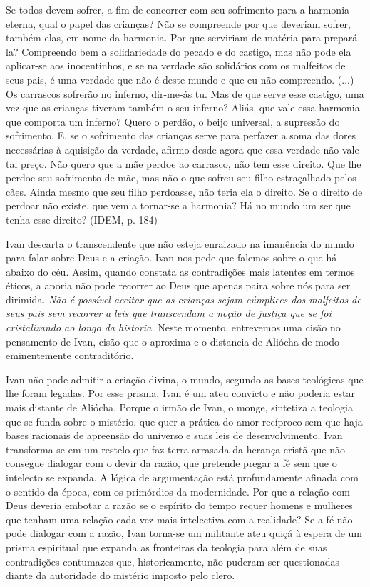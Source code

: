 Se todos devem sofrer, a fim de concorrer com seu sofrimento para a
harmonia eterna, qual o papel das crianças? Não se compreende por que
deveriam sofrer, também elas, em nome da harmonia. Por que serviriam de
matéria para prepará-la? Compreendo bem a solidariedade do pecado e do
castigo, mas não pode ela aplicar-se aos inocentinhos, e se na verdade
são solidários com os malfeitos de seus pais, é uma verdade que não é
deste mundo e que eu não compreendo. (...) Os carrascos sofrerão no
inferno, dir-me-ás tu. Mas de que serve esse castigo, uma vez que as
crianças tiveram também o seu inferno? Aliás, que vale essa harmonia que
comporta um inferno? Quero o perdão, o beijo universal, a supressão do
sofrimento. E, se o sofrimento das crianças serve para perfazer a soma
das dores necessárias à aquisição da verdade, afirmo desde agora que
essa verdade não vale tal preço. Não quero que a mãe perdoe ao carrasco,
não tem esse direito. Que lhe perdoe seu sofrimento de mãe, mas não o
que sofreu seu filho estraçalhado pelos cães. Ainda mesmo que seu filho
perdoasse, não teria ela o direito. Se o direito de perdoar não existe,
que vem a tornar-se a harmonia? Há no mundo um ser que tenha esse
direito? (IDEM, p. 184)

Ivan descarta o transcendente que não esteja enraizado na imanência do
mundo para falar sobre Deus e a criação. Ivan nos pede que falemos sobre
o que há abaixo do céu. Assim, quando constata as contradições mais
latentes em termos éticos, a aporia não pode recorrer ao Deus que apenas
paira sobre nós para ser dirimida. \emph{Não é possível aceitar que as
crianças sejam cúmplices dos malfeitos de seus pais sem recorrer a leis
que transcendam a noção de justiça que se foi cristalizando ao longo da
historia.} Neste momento, entrevemos uma cisão no pensamento de Ivan,
cisão que o aproxima e o distancia de Aliócha de modo eminentemente
contraditório.

Ivan não pode admitir a criação divina, o mundo, segundo as bases
teológicas que lhe foram legadas. Por esse prisma, Ivan é um ateu
convicto e não poderia estar mais distante de Aliócha. Porque o irmão de
Ivan, o monge, sintetiza a teologia que se funda sobre o mistério, que
quer a prática do amor recíproco sem que haja bases racionais de
apreensão do universo e suas leis de desenvolvimento. Ivan transforma-se
em um restelo que faz terra arrasada da herança cristã que não consegue
dialogar com o devir da razão, que pretende pregar a fé sem que o
intelecto se expanda. A lógica de argumentação está profundamente
afinada com o sentido da época, com os primórdios da modernidade. Por
que a relação com Deus deveria embotar a razão se o espírito do tempo
requer homens e mulheres que tenham uma relação cada vez mais
intelectiva com a realidade? Se a fé não pode dialogar com a razão, Ivan
torna-se um militante ateu quiçá à espera de um prisma espiritual que
expanda as fronteiras da teologia para além de suas contradições
contumazes que, historicamente, não puderam ser questionadas diante da
autoridade do mistério imposto pelo clero.

